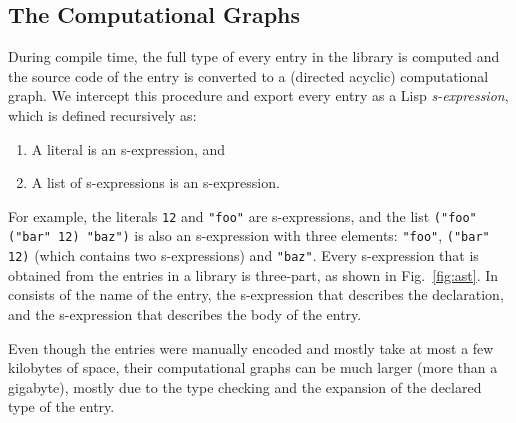 \documentclass{article}
\begin{document}
\subsection{The Computational Graphs}\label{sec:compute-graph}
During compile time, the full type of every entry in the library is computed and the source code of the entry is converted to a (directed acyclic) computational graph. We intercept this procedure and export every entry as a Lisp \textit{s-expression}, which is defined recursively as:
\begin{enumerate}
    \item A literal is an s-expression, and
    \item A list of s-expressions is an s-expression.
\end{enumerate}
For example, the literals \texttt{12} and \texttt{"foo"} are s-expressions, and the list \texttt{("foo" ("bar" 12) "baz")} is also an s-expression with three elements: \texttt{"foo"}, \texttt{("bar" 12)} (which contains two s-expressions) and \texttt{"baz"}. Every s-expression that is obtained from the entries in a library is three-part, as shown in Fig.~\ref{fig:ast}. In consists of the name of the entry, the s-expression that describes the declaration, and the s-expression that describes the body of the entry.

Even though the entries were manually encoded and mostly take at most a few kilobytes of space, their computational graphs can be much larger (more than a gigabyte), mostly due to the type checking and the expansion of the declared type of the entry.

\end{document}
